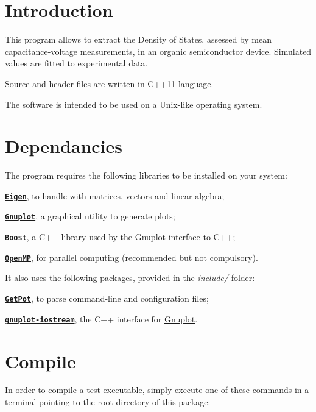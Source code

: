 \hypertarget{index_intro}{}\section{Introduction}\label{index_intro}
This program allows to extract the Density of States, assessed by mean capacitance-\/voltage measurements, in an organic semiconductor device. Simulated values are fitted to experimental data. \par
Source and header files are written in C++11 language. \par
The software is intended to be used on a Unix-\/like operating system.\hypertarget{index_dependancies}{}\section{Dependancies}\label{index_dependancies}
The program requires the following libraries to be installed on your system\-:

\begin{DoxyItemize}
\item \label{index_Eigen}%
\hypertarget{index_Eigen}{}%
\href{http://eigen.tuxfamily.org}{\tt {\bfseries Eigen}}, to handle with matrices, vectors and linear algebra; \item \label{index_Gnuplot}%
\hypertarget{index_Gnuplot}{}%
\href{http://www.gnuplot.info}{\tt {\bfseries Gnuplot}}, a graphical utility to generate plots; \item \href{http://www.boost.org}{\tt {\bfseries Boost}}, a C++ library used by the \hyperlink{index_Gnuplot}{Gnuplot} interface to C++; \item \href{http://openmp.org}{\tt {\bfseries Open\-M\-P}}, for parallel computing (recommended but not compulsory).\end{DoxyItemize}
It also uses the following packages, provided in the {\itshape include/} folder\-: \begin{DoxyItemize}
\item \href{http://getpot.sourceforge.net}{\tt {\bfseries Get\-Pot}}, to parse command-\/line and configuration files; \item \href{http://www.stahlke.org/dan/gnuplot-iostream}{\tt {\bfseries gnuplot-\/iostream}}, the C++ interface for \hyperlink{index_Gnuplot}{Gnuplot}.\end{DoxyItemize}
\hypertarget{index_install_sec}{}\section{Compile}\label{index_install_sec}
In order to compile a test executable, simply execute one of these commands in a terminal pointing to the root directory of this package\-:



